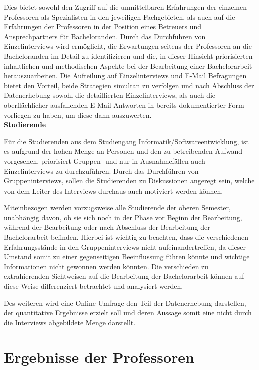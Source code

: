 \documentclass{scrreprt}
\begin{document}
\par Dies bietet sowohl den Zugriff auf die unmittelbaren Erfahrungen der einzelnen Professoren als Spezialisten in den jeweiligen Fachgebieten, als auch auf die Erfahrungen der Professoren in der Position eines Betreuers und Ansprechpartners für Bacheloranden. Durch das Durchführen von Einzelinterviews wird ermöglicht, die Erwartungen seitens der Professoren an die Bacheloranden im Detail zu identifizieren und die, in dieser Hinsicht priorisierten inhaltlichen und methodischen Aspekte bei der Bearbeitung einer Bachelorarbeit herauszuarbeiten. Die Aufteilung auf Einzelinterviews und E-Mail Befragungen bietet den Vorteil, beide Strategien simultan zu verfolgen und nach Abschluss der Datenerhebung sowohl die detaillierten Einzelinterviews, als auch die oberflächlicher ausfallenden E-Mail Antworten in bereits dokumentierter Form vorliegen zu haben, um diese dann auszuwerten.\\

\textbf{Studierende}
\par Für die Studierenden aus dem Studiengang Informatik/Softwareentwicklung, ist es aufgrund der hohen Menge an Personen und den zu betreibenden Aufwand vorgesehen, priorisiert Gruppen- und nur in Ausnahmefällen auch Einzelinterviews zu durchzuführen. 
Durch das Durchführen von Gruppeninterviews, sollen die Studierenden zu Diskussionen angeregt sein, welche von dem Leiter des Interviews durchaus auch motiviert werden können.
\par Miteinbezogen werden vorzugsweise alle Studierende der oberen Semester, unabhängig davon, ob sie sich noch in der Phase vor Beginn der Bearbeitung, während der Bearbeitung oder nach Abschluss der Bearbeitung der Bachelorarbeit befinden. Hierbei ist wichtig zu beachten, dass die verschiedenen Erfahrungsstände in den Gruppeninterviews nicht aufeinandertreffen, da dieser Umstand somit zu einer gegenseitigen Beeinflussung führen könnte und wichtige Informationen nicht gewonnen werden könnten. Die verschieden zu extrahierenden Sichtweisen auf die Bearbeitung der Bachelorarbeit können auf diese Weise differenziert betrachtet und analysiert werden.
\par Des weiteren wird eine Online-Umfrage den Teil der Datenerhebung darstellen, der quantitative Ergebnisse erzielt soll und deren Aussage somit eine nicht durch die Interviews abgebildete Menge darstellt.

\section{Ergebnisse der Professoren}
\end{document}
